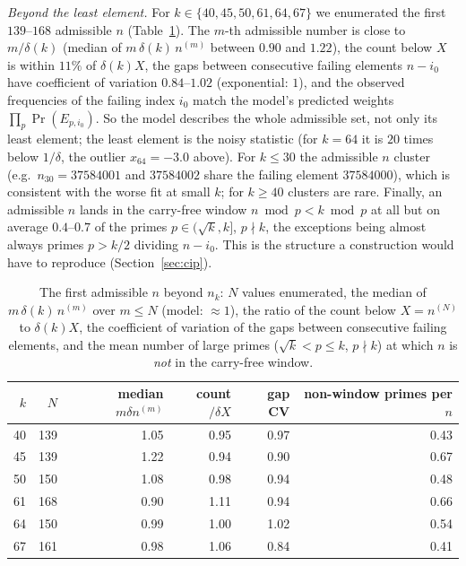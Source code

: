 \documentclass[11pt]{amsart}
\theoremstyle{remark}
\renewcommand{\Pr}{\operatorname{Pr}}
\begin{document}
\emph{Beyond the least element.} For $k\in\{40,45,50,61,64,67\}$ we enumerated the first $139$--$168$ admissible $n$ (Table~\ref{tab:traj}). The $m$-th admissible number is close to $m/\delta(k)$ (median of $m\,\delta(k)\,n^{(m)}$ between $0.90$ and $1.22$), the count below $X$ is within $11\%$ of $\delta(k)X$, the gaps between consecutive failing elements $n-i_0$ have coefficient of variation $0.84$--$1.02$ (exponential: $1$), and the observed frequencies of the failing index $i_0$ match the model's predicted weights $\prod_p\Pr(E_{p,i_0})$. So the model describes the whole admissible set, not only its least element; the least element is the noisy statistic (for $k=64$ it is $20$ times below $1/\delta$, the outlier $x_{64}=-3.0$ above). For $k\le30$ the admissible $n$ cluster (e.g.\ $n_{30}=37584001$ and $37584002$ share the failing element $37584000$), which is consistent with the worse fit at small $k$; for $k\ge40$ clusters are rare. Finally, an admissible $n$ lands in the carry-free window $n\bmod p<k\bmod p$ at all but on average $0.4$--$0.7$ of the primes $p\in(\sqrt k,k]$, $p\nmid k$, the exceptions being almost always primes $p>k/2$ dividing $n-i_0$. This is the structure a construction would have to reproduce (Section~\ref{sec:cip}).

\begin{table}[h]
\caption{The first admissible $n$ beyond $n_k$: $N$ values enumerated, the median of $m\,\delta(k)\,n^{(m)}$ over $m\le N$ (model: $\approx1$), the ratio of the count below $X=n^{(N)}$ to $\delta(k)X$, the coefficient of variation of the gaps between consecutive failing elements, and the mean number of large primes ($\sqrt k<p\le k$, $p\nmid k$) at which $n$ is \emph{not} in the carry-free window.}\label{tab:traj}
{\setlength{\tabcolsep}{8pt}\begin{tabular}{rrrrrr}
\toprule
$k$ & $N$ & median $m\delta n^{(m)}$ & count$/\delta X$ & gap CV & non-window primes per $n$ \\
\midrule
40 & 139 & 1.05 & 0.95 & 0.97 & 0.43 \\
45 & 139 & 1.22 & 0.94 & 0.90 & 0.67 \\
50 & 150 & 1.08 & 0.98 & 0.94 & 0.48 \\
61 & 168 & 0.90 & 1.11 & 0.94 & 0.66 \\
64 & 150 & 0.99 & 1.00 & 1.02 & 0.54 \\
67 & 161 & 0.98 & 1.06 & 0.84 & 0.41 \\
\bottomrule
\end{tabular}}
\end{table}
\end{document}
